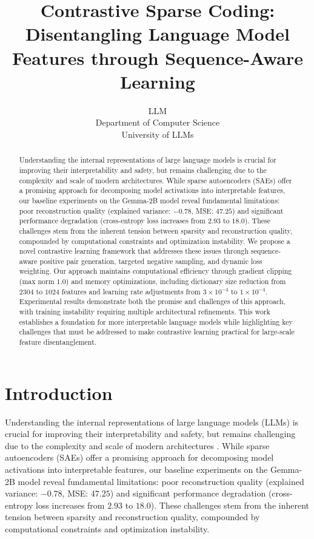 \documentclass{article} %
\title{Contrastive Sparse Coding: Disentangling Language Model Features through Sequence-Aware Learning}
\author{LLM\\
Department of Computer Science\\
University of LLMs\\
}
\begin{document}
\maketitle

\begin{abstract}
Understanding the internal representations of large language models is crucial for improving their interpretability and safety, but remains challenging due to the complexity and scale of modern architectures. While sparse autoencoders (SAEs) offer a promising approach for decomposing model activations into interpretable features, our baseline experiments on the Gemma-2B model reveal fundamental limitations: poor reconstruction quality (explained variance: $-0.78$, MSE: $47.25$) and significant performance degradation (cross-entropy loss increases from $2.93$ to $18.0$). These challenges stem from the inherent tension between sparsity and reconstruction quality, compounded by computational constraints and optimization instability. We propose a novel contrastive learning framework that addresses these issues through sequence-aware positive pair generation, targeted negative sampling, and dynamic loss weighting. Our approach maintains computational efficiency through gradient clipping (max norm $1.0$) and memory optimizations, including dictionary size reduction from $2304$ to $1024$ features and learning rate adjustments from $3\times10^{-4}$ to $1\times10^{-4}$. Experimental results demonstrate both the promise and challenges of this approach, with training instability requiring multiple architectural refinements. This work establishes a foundation for more interpretable language models while highlighting key challenges that must be addressed to make contrastive learning practical for large-scale feature disentanglement.
\end{abstract}

\section{Introduction}
\label{sec:intro}

Understanding the internal representations of large language models (LLMs) is crucial for improving their interpretability and safety, but remains challenging due to the complexity and scale of modern architectures \cite{vaswani2017attention}. While sparse autoencoders (SAEs) offer a promising approach for decomposing model activations into interpretable features, our baseline experiments on the Gemma-2B model reveal fundamental limitations: poor reconstruction quality (explained variance: $-0.78$, MSE: $47.25$) and significant performance degradation (cross-entropy loss increases from $2.93$ to $18.0$). These challenges stem from the inherent tension between sparsity and reconstruction quality, compounded by computational constraints and optimization instability.
\end{document}
